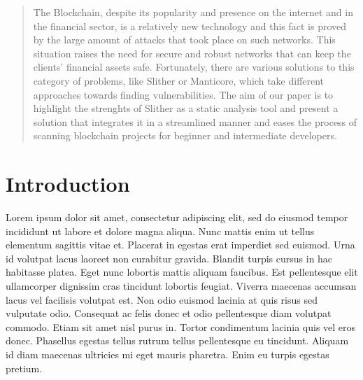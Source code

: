 \begin{abstract}
    The Blockchain, despite its popularity and presence on the internet and in the financial sector, is a relatively new technology and this fact is proved by the large amount of attacks that took place on such networks. This situation raises the need for secure and robust networks that can keep the clients’ financial assets safe. Fortunately, there are various solutions to this category of problems, like Slither or Manticore, which take different approaches towards finding vulnerabilities. The aim of our paper is to highlight the strenghts of Slither as a static analysis tool and present a solution that integrates it in a streamlined manner and eases the process of scanning blockchain projects for beginner and intermediate developers.
\end{abstract}

\chapter*{Introduction} 

Lorem ipsum dolor sit amet, consectetur adipiscing elit, sed do eiusmod tempor incididunt ut labore et dolore magna aliqua. Nunc mattis enim ut tellus elementum sagittis vitae et. Placerat in egestas erat imperdiet sed euismod. Urna id volutpat lacus laoreet non curabitur gravida. Blandit turpis cursus in hac habitasse platea. Eget nunc lobortis mattis aliquam faucibus. Est pellentesque elit ullamcorper dignissim cras tincidunt lobortis feugiat. Viverra maecenas accumsan lacus vel facilisis volutpat est. Non odio euismod lacinia at quis risus sed vulputate odio. Consequat ac felis donec et odio pellentesque diam volutpat commodo. Etiam sit amet nisl purus in. Tortor condimentum lacinia quis vel eros donec. Phasellus egestas tellus rutrum tellus pellentesque eu tincidunt. Aliquam id diam maecenas ultricies mi eget mauris pharetra. Enim eu turpis egestas pretium.